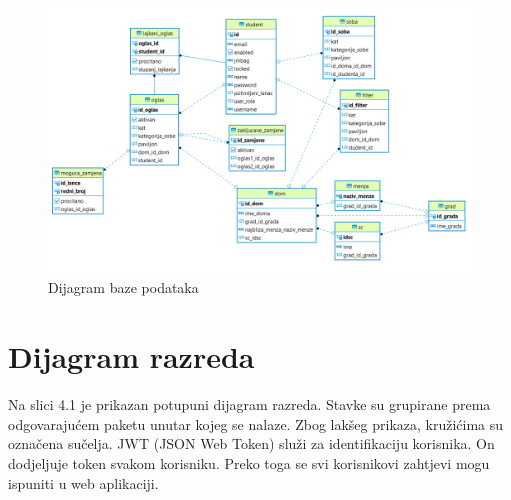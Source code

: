 			\begin{figure}[H]
			\includegraphics[scale=0.7]{slike/novi_er_model.png} 
			\centering
			\caption{Dijagram baze podataka}
			\label{fig:baza}
		\end{figure}
		
\eject
			
			
			
		\section{Dijagram razreda}
		
		Na slici 4.1 je prikazan potupuni dijagram razreda. Stavke su grupirane prema odgovarajućem paketu unutar kojeg se nalaze. Zbog lakšeg prikaza, kružićima su označena sučelja.
		\newline
		JWT (JSON Web Token) služi za identifikaciju korisnika. On dodjeljuje token svakom korisniku. Preko toga se svi korisnikovi zahtjevi mogu ispuniti u web aplikaciji.
		
